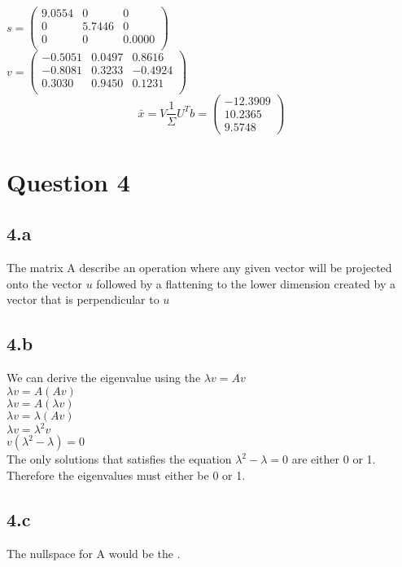 \documentclass{article}
\begin{document}
$s =
\begin{pmatrix}
    9.0554   &      0   &     0 \\
         0   & 5.7446   &      0\\
         0   &      0   & 0.0000\\
\end{pmatrix}$\\

$v =
\begin{pmatrix}
   -0.5051  &  0.0497  &  0.8616\\
   -0.8081  &  0.3233  & -0.4924\\
    0.3030  &  0.9450  &  0.1231\\
\end{pmatrix}$
\begin{equation*}
\bar{x} = V\frac{1}{\Sigma}U^Tb = 
\begin{pmatrix}
-12.3909 \\
10.2365 \\
9.5748
\end{pmatrix}
\end{equation*}
\section{Question 4}
\subsection*{4.a}
The matrix A describe an operation where any given vector will be projected onto the vector $u$ followed by a flattening to the lower dimension created by a vector that is perpendicular to $u$
\subsection*{4.b}
We can derive the eigenvalue using the $\lambda v = Av$ \\
$\lambda v = A(Av)$ \\
$\lambda v = A(\lambda v)$ \\
$\lambda v = \lambda (A v)$ \\
$\lambda v = \lambda^2 v$ \\
$v(\lambda^2 - \lambda) = 0$ \\
The only solutions that satisfies the equation $\lambda^2 - \lambda = 0$ are either 0 or 1. Therefore the eigenvalues must either be 0 or 1.

\subsection*{4.c}
The nullspace for A would be the .
\end{document}
